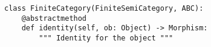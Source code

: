 \par\begin{minipage}{60ex}
\begin{verbatim}
class FiniteCategory(FiniteSemiCategory, ABC):
    @abstractmethod
    def identity(self, ob: Object) -> Morphism:
        """ Identity for the object """
\end{verbatim}
\end{minipage}\par